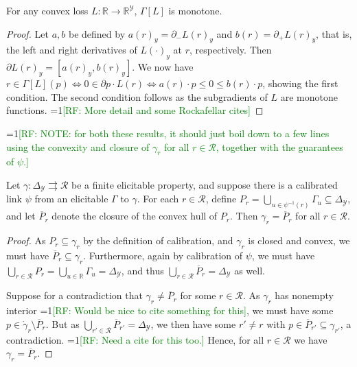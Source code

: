 \documentclass[anon,12pt]{colt2019}
\newcommand{\Comments}{1}
\newcommand{\mynote}[2]{\ifnum\Comments=1\textcolor{#1}{#2}\fi}
\newcommand{\raf}[1]{\mynote{green}{[RF: #1]}}
\newcommand{\reals}{\mathbb{R}}
\newcommand{\prop}[1]{\Gamma[#1]}
\newcommand{\simplex}{\Delta_\Y}
\newcommand{\R}{\mathcal{R}}
\newcommand{\Y}{\mathcal{Y}}
\newcommand{\inter}[1]{\mathring{#1}}%
\newcommand{\toto}{\rightrightarrows}
\begin{document}
\begin{lemma}\label{lem:prop-L-monotone}
  For any convex loss $L : \reals \to \reals^\Y$, $\prop{L}$ is monotone.
\end{lemma}
\begin{proof}
  Let $a,b$ be defined by $a(r)_y = \partial_- L(r)_y$ and $b(r) = \partial_+ L(r)_y$, that is, the left and right derivatives of $L(\cdot)_y$ at $r$, respectively.
  Then $\partial L(r)_y = [a(r)_y,b(r)_y]$.
  We now have $r \in \prop{L}(p) \iff 0 \in \partial p\cdot L(r) \iff a(r)\cdot p \leq 0 \leq b(r) \cdot p$, showing the first condition.
  The second condition follows as the subgradients of $L$ are monotone functions.
  \raf{More detail and some Rockafellar cites}
\end{proof}

\raf{NOTE: for both these results, it should just boil down to a few lines using the convexity and closure of $\gamma_r$ for all $r\in\R$, together with the guarantees of $\psi$.}

\newcommand{\Pbar}{\overline P}
\begin{lemma}\label{lem:pbar}
  Let $\gamma:\simplex\toto\R$ be a finite elicitable property, and suppose there is a calibrated link $\psi$ from an elicitable $\Gamma$ to $\gamma$.
  For each $r\in\R$, define $P_r = \bigcup_{u\in\psi^{-1}(r)} \Gamma_u \subseteq \simplex$, and let $\Pbar_r$ denote the closure of the convex hull of $P_r$.
  Then $\gamma_r = \Pbar_r$ for all $r\in\R$.
\end{lemma}
\begin{proof}
  As $P_r \subseteq \gamma_r$ by the definition of calibration, and $\gamma_r$ is closed and convex, we must have $\Pbar_r \subseteq \gamma_r$.
  Furthermore, again by calibration of $\psi$, we must have $\bigcup_{r\in\R} P_r = \bigcup_{u\in\reals} \Gamma_u = \simplex$, and thus $\bigcup_{r\in\R} \Pbar_r = \simplex$ as well.

  Suppose for a contradiction that $\gamma_r \neq \Pbar_r$ for some $r\in\R$.
  As $\gamma_r$ has nonempty interior \raf{Would be nice to cite something for this}, we must have some $p\in\inter\gamma_r \setminus \Pbar_r$.
  But as $\bigcup_{r'\in\R} \Pbar_{r'} = \simplex$, we then have some $r'\neq r$ with $p\in\Pbar_{r'} \subseteq \gamma_{r'}$, a contradiction.
  \raf{Need a cite for this too.}
  Hence, for all $r\in\R$ we have $\gamma_r = \Pbar_r$.
\end{proof}
\end{document}

